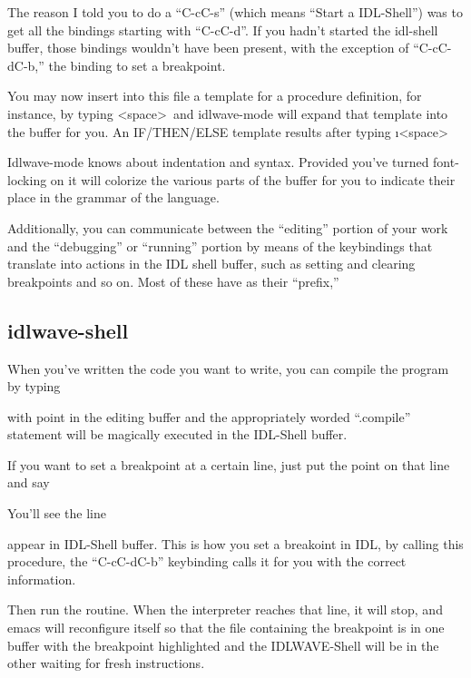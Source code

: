   The reason I told you to do a ``C-cC-s'' (which means ``Start a
  IDL-Shell'') was to get all the bindings starting with
  ``C-cC-d''. If you hadn't started the idl-shell buffer, those
  bindings wouldn't have been present, with the exception of
  ``C-cC-dC-b,'' the binding to set a breakpoint.


  You may now insert into this file a template for a procedure
  definition, for instance, by typing \V\pr<space>\ and idlwave-mode
  will expand that template into the buffer for you. An IF/THEN/ELSE
  template results after typing \V\i<space>\

  Idlwave-mode knows about indentation and syntax. Provided you've
  turned font-locking on it will colorize the various parts of the
  buffer for you to indicate their place in the grammar of the
  language. 

  Additionally, you can communicate between the ``editing'' portion of
  your work and the ``debugging'' or ``running'' portion by means of
  the keybindings that translate into actions in the IDL shell buffer,
  such as setting and clearing breakpoints and so on. Most of these
  have  as their ``prefix,''


\subsection{idlwave-shell}\label{sec:qs-idlwave-shell}

  When you've written the code you want to write, you can compile the
  program by typing 


   with point in the editing buffer and  the
  appropriately worded ``.compile'' statement will be magically
  executed in the IDL-Shell buffer.

  If you want to set a breakpoint at a certain line, just put the point
  on that line and say 


  You'll see the line


  appear in IDL-Shell buffer. This is how you set a breakoint in IDL,
  by calling this procedure, the ``C-cC-dC-b'' keybinding calls it
  for you with the correct information.

  Then run the routine. When the interpreter reaches that line, it
  will stop, and emacs will reconfigure itself so that the file
  containing the breakpoint is in one buffer with the breakpoint
  highlighted and the IDLWAVE-Shell will be in the other waiting for
  fresh instructions.

